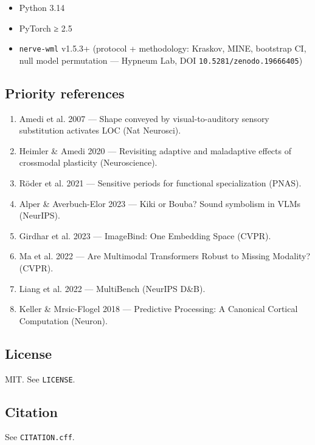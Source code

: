 \documentclass[
]{article}
\providecommand{\tightlist}{%
  \setlength{\itemsep}{0pt}\setlength{\parskip}{0pt}}
\begin{document}
\begin{itemize}
\tightlist
\item
  Python 3.14
\item
  PyTorch ≥ 2.5
\item
  \texttt{nerve-wml} v1.5.3+ (protocol + methodology: Kraskov, MINE,
  bootstrap CI, null model permutation --- Hypneum Lab, DOI
  \texttt{10.5281/zenodo.19666405})
\end{itemize}

\subsection{Priority references}\label{priority-references}

\begin{enumerate}
\def\labelenumi{\arabic{enumi}.}
\tightlist
\item
  Amedi et al. 2007 --- Shape conveyed by visual-to-auditory sensory
  substitution activates LOC (Nat Neurosci).
\item
  Heimler \& Amedi 2020 --- Revisiting adaptive and maladaptive effects
  of crossmodal plasticity (Neuroscience).
\item
  Röder et al. 2021 --- Sensitive periods for functional specialization
  (PNAS).
\item
  Alper \& Averbuch-Elor 2023 --- Kiki or Bouba? Sound symbolism in VLMs
  (NeurIPS).
\item
  Girdhar et al. 2023 --- ImageBind: One Embedding Space (CVPR).
\item
  Ma et al. 2022 --- Are Multimodal Transformers Robust to Missing
  Modality? (CVPR).
\item
  Liang et al. 2022 --- MultiBench (NeurIPS D\&B).
\item
  Keller \& Mrsic-Flogel 2018 --- Predictive Processing: A Canonical
  Cortical Computation (Neuron).
\end{enumerate}

\subsection{License}\label{license}

MIT. See \texttt{LICENSE}.

\subsection{Citation}\label{citation}

See \texttt{CITATION.cff}.
\end{document}
